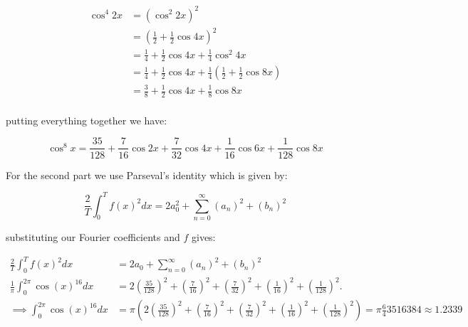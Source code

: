 \documentclass[11pt]{article}
\begin{document}
\begin{solution}
\begin{align*}
\cos^4 2x &= (\cos^2 2x)^2\\
&=(\frac 1 2 + \frac 1 2 \cos 4x)^2\\
&= \frac 1 4 + \frac 1 2 \cos 4x + \frac 1 4 \cos^2 4x\\
&= \frac 1 4 + \frac 1 2 \cos 4x + \frac 1 4 (\frac 1 2 + \frac 1 2 \cos 8x)\\
&= \frac 3 8 + \frac 1 2 \cos 4x + \frac 1 8 \cos 8x\\
\end{align*}

putting everything together we have:

$$
\cos^8x  = \frac{35}{128} + \frac{7}{16}\cos 2x + \frac{7}{32}\cos 4x + \frac{1}{16} \cos 6x + \frac{1}{128}\cos 8x
$$

For the second part we use Parseval's identity which is given by: 

$$
\frac{2}{T} \int_0^T f(x)^2 d x=2 a_0^2+\sum_{n=0}^{\infty}\left(a_n\right)^2+\left(b_n\right)^2
$$

substituting our Fourier coefficients and $f$ gives: 

\begin{align*}
\frac{2}{T} \int_0^T f(x)^2 d x&=2 a_0+\sum_{n=0}^{\infty}\left(a_n\right)^2+\left(b_n\right)^2\\
\frac{1}{\pi} \int_0^{2\pi} \cos(x)^{16} d x&= 2\left(\frac{35}{128}\right)^2 + \left(\frac{7}{16}\right)^2 + \left(\frac{7}{32}\right)^2 + \left(\frac{1}{16}\right)^2 + \left(\frac{1}{128}\right)^2.\\
\implies \int_0^{2\pi} \cos(x)^{16} d x&= \pi\left(2\left(\frac{35}{128}\right)^2 + \left(\frac{7}{16}\right)^2 + \left(\frac{7}{32}\right)^2 + \left(\frac{1}{16}\right)^2 + \left(\frac{1}{128}\right)^2\right) = \pi\frac 6435 16384 \approx 1.2339\\
\end{align*}

\end{solution}
\end{document}
